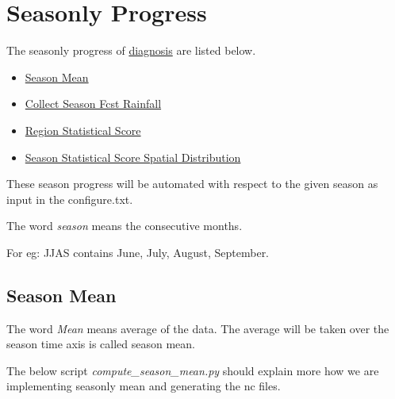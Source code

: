 \documentclass[letterpaper,10pt,english]{sphinxmanual}
\begin{document}
\section{Seasonly Progress}
\label{diagnosis:seasonly-progress}
The seasonly progress of {\hyperref[diagnosis:diagnosis]{diagnosis}} are listed below.
\begin{itemize}
\item {} 
{\hyperref[diagnosis:season-mean]{Season Mean}}

\item {} 
{\hyperref[diagnosis:collect-season-fcst-rainfall]{Collect Season Fcst Rainfall}}

\item {} 
{\hyperref[diagnosis:region-statistical-score]{Region Statistical Score}}

\item {} 
{\hyperref[diagnosis:season-statistical-score-spatial-distribution]{Season Statistical Score Spatial Distribution}}

\end{itemize}

These season progress will be automated with respect to the given season as input in the configure.txt.

The word \emph{season} means the consecutive months.

For eg: JJAS contains June, July, August, September.


\subsection{Season Mean}
\label{diagnosis:season-mean}
The word \emph{Mean} means average of the data. The average will be taken over the season time axis is called season mean.

The below script \emph{compute\_season\_mean.py} should explain more how we are implementing seasonly mean and generating the nc files.
\label{diagnosis:module-compute_season_mean}\label{diagnosis:module-compute_season_mean.py}
\end{document}
